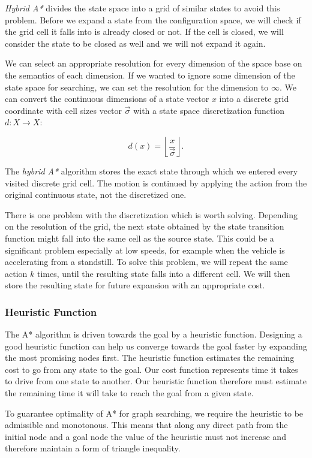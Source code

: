 \textit{Hybrid A*} divides the state space into a grid of similar states to avoid this problem. Before we expand a state from the configuration space, we will check if the grid cell it falls into is already closed or not. If the cell is closed, we will consider the state to be closed as well and we will not expand it again.

We can select an appropriate resolution for every dimension of the space base on the semantics of each dimension. If we wanted to ignore some dimension of the state space for searching, we can set the resolution for the dimension to $\infty$. We can convert the continuous dimensions of a state vector $x$ into a discrete grid coordinate with cell sizes vector $\vec{\sigma}$ with a state space discretization function $d: X\rightarrow X$:

\[
d(x) = \left\lfloor \dfrac{x}{\vec{\sigma}} \right\rfloor.
\]

The \textit{hybrid A*} algorithm stores the exact state through which we entered every visited discrete grid cell. The motion is continued by applying the action from the original continuous state, not the discretized one.

There is one problem with the discretization which is worth solving. Depending on the resolution of the grid, the next state obtained by the state transition function might fall into the same cell as the source state. This could be a significant problem especially at low speeds, for example when the vehicle is accelerating from a standstill. To solve this problem, we will repeat the same action $k$ times, until the resulting state falls into a different cell. We will then store the resulting state for future expansion with an appropriate cost.

\subsubsection{Heuristic Function}

The A* algorithm is driven towards the goal by a heuristic function. Designing a good heuristic function can help us converge towards the goal faster by expanding the most promising nodes first. The heuristic function estimates the remaining cost to go from any state to the goal. Our cost function represents time it takes to drive from one state to another. Our heuristic function therefore must estimate the remaining time it will take to reach the goal from a given state.

To guarantee optimality of A* for graph searching, we require the heuristic to be admissible and monotonous. This means that along any direct path from the initial node and a goal node the value of the heuristic must not increase and therefore maintain a form of triangle inequality.

